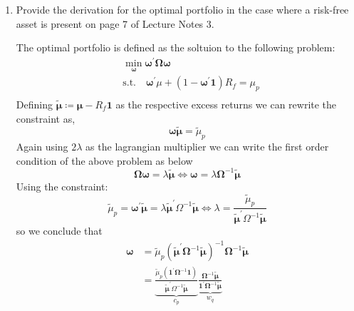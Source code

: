 \documentclass[12pt,twoside]{article}
\begin{document}
\begin{enumerate}
\begin{solution}
    \end{solution}
    \item Provide the derivation for the optimal portfolio in the case where a risk-free asset is present on page 7 of Lecture Notes 3.
    \begin{solution}
        The optimal portfolio is defined as the soltuion to the following problem:
        \begin{align*}
            & \min_{\mathbf \omega} \mathbf\omega^\prime \mathbf\Omega \mathbf \omega \\
            & \text{s.t.} \quad \mathbf\omega^\prime \mu + \left(1-\mathbf\omega^\prime\mathbf 1\right)R_f = \mu_p \\
        \end{align*}
        Defining \(\mathbf{\tilde\mu} \coloneqq \mathbf \mu - R_f\mathbf 1\) as the respective excess returns we can rewrite the constraint as,
        \[
            \mathbf\omega\mathbf{\tilde\mu} = \tilde\mu_p
        \]
        Again using \(2\lambda\) as the lagrangian multiplier we can write the first order condition of the above problem as below
        \[
            \mathbf\Omega\mathbf\omega = \lambda \mathbf{\tilde\mu} \iff \mathbf \omega = \lambda \mathbf\Omega^{-1}\mathbf{\tilde\mu}
        \]
        Using the constraint:
        \[
            \tilde\mu_p = \mathbf\omega^\prime\mathbf{\tilde\mu} = \lambda\mathbf{\tilde\mu}^\prime\Omega^{-1}\mathbf{\tilde\mu} \iff \lambda = \frac{\tilde\mu_p}{\mathbf{\tilde\mu}^\prime\Omega^{-1}\mathbf{\tilde\mu}}
        \]
        so we conclude that
        \begin{align*}
            \mathbf\omega & = \tilde\mu_p \left(\mathbf{\tilde\mu}^\prime\mathbf\Omega^{-1}\mathbf{\tilde\mu}\right)^{-1}\mathbf\Omega^{-1}\mathbf{\tilde\mu} \\
            & = \underbrace{\frac{\tilde\mu_p\left(\mathbf 1^\prime\mathbf \Omega^{-1}\mathbf 1\right)}{\mathbf{\tilde\mu}^\prime\Omega^{-1}\mathbf{\tilde\mu}}}_{c_p} \underbrace{\frac{\mathbf\Omega^{-1}\mathbf{\tilde\mu}}{\mathbf 1^\prime \mathbf\Omega^{-1}\mathbf{\tilde\mu}}}_{w_q}
        \end{align*}
    \end{solution}
\end{enumerate}

$ $\clearpage


\end{document}

